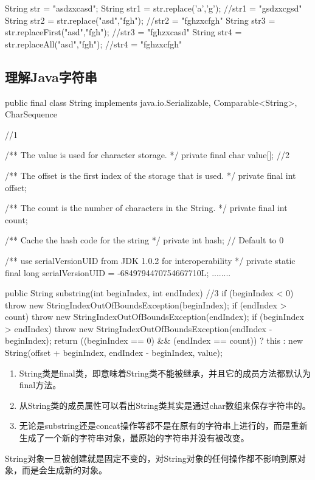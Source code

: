 
\begin{javaCode}
  String str = "asdzxcasd";
  String str1 = str.replace('a','g'); //str1 = "gsdzxcgsd"
  String str2 = str.replace("asd","fgh"); //str2 = "fghzxcfgh"
  String str3 = str.replaceFirst("asd","fgh"); //str3 = "fghzxcasd"
  String str4 = str.replaceAll("asd","fgh"); //str4 = "fghzxcfgh"
\end{javaCode}

\subsection{理解Java字符串}


\begin{javaCode}
  public final class String
  implements java.io.Serializable, Comparable<String>, CharSequence { //1

    /** The value is used for character storage. */
    private final char value[]; //2
    
    /** The offset is the first index of the storage that is used. */
    private final int offset;
    
    /** The count is the number of characters in the String. */
    private final int count;
    
    /** Cache the hash code for the string */
    private int hash; // Default to 0

    /** use serialVersionUID from JDK 1.0.2 for interoperability */
    private static final long serialVersionUID = -6849794470754667710L;
    ........

    public String substring(int beginIndex, int endIndex) { //3
      if (beginIndex < 0) {
        throw new StringIndexOutOfBoundsException(beginIndex);
      }
      if (endIndex > count) {
        throw new StringIndexOutOfBoundsException(endIndex);
      }
      if (beginIndex > endIndex) {
        throw new StringIndexOutOfBoundsException(endIndex - beginIndex);
      }
      return ((beginIndex == 0) && (endIndex == count)) ? this :
      new String(offset + beginIndex, endIndex - beginIndex, value);
    }
}
\end{javaCode}

\begin{enumerate}
\item String类是final类，即意味着String类不能被继承，并且它的成员方法都默认为final方法。
\item 从String类的成员属性可以看出String类其实是通过char数组来保存字符串的。
\item 无论是substring还是concat操作等都不是在原有的字符串上进行的，而是重新生成了一个新的字符串对象，最原始的字符串并没有被改变。

\end{enumerate}


String对象一旦被创建就是固定不变的，对String对象的任何操作都不影响到原对象，而是会生成新的对象。